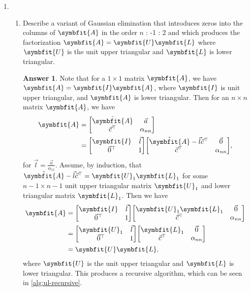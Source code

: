 \documentclass{article}
\theoremstyle{definition}
\newtheorem*{answer}{Answer}
\newcommand{\mat}[1]{\symbfit{#1}}
\begin{document}
\begin{enumerate}[leftmargin=\labelsep]
	\item
	      \begin{enumerate}
		      \item Describe a variant of Gaussian elimination that introduces zeros into the columns of \(\mat{A}\) in the order \(n\) : -1 : 2 and which produces the factorization \(\mat{A} = \mat{U}\mat{L}\) where \(\mat{U}\) is the unit upper triangular and \(\mat{L}\) is lower triangular.
		            \begin{answer}
			            Note that for a \(1 \times 1\) matrix \(\mat{A}\), we have \(\mat{A} = \mat{I}\mat{A}\), where \(\mat{I}\) is unit upper triangular, and \(\mat{A}\) is lower triangular. Then for an \(n \times n\) matrix \(\mat{A}\), we have
			            \begin{align}
				            \mat{A} & = \mqty[\hat{\mat{A}} & \vec{a} \\\vec{c}^\top & \alpha_{nn}]                                        \\
				                    & = \mqty[\mat{I}       & \vec{l} \\\vec{0}^\top & 1]\mqty[\hat{\mat{A}}-\vec{l}\vec{c}^\top & \vec{0} \\\vec{c}^\top&\alpha_{nn}],
			            \end{align}
			            for \(\vec{l} = \frac{\vec{a}}{\alpha_{11}}\). Assume, by induction, that \(\hat{\mat{A}}-\vec{l}\vec{c}^\top = \mat{U}_1\mat{L}_1\) for some \(n-1 \times n-1\) unit upper triangular matrix \(\mat{U}_1\) and lower triangular matrix \(\mat{L}_1\). Then we have
			            \begin{align*}
				            \mat{A} & = \mqty[\mat{I}   & \vec{l} \\\vec{0}^\top & 1]\mqty[\mat{U}_1\mat{L}_1 & \vec{0}\\\vec{c}^\top & \alpha_{nn}] \\
				                    & = \mqty[\mat{U}_1 & \vec{l} \\\vec{0}^\top & 1]\mqty[\mat{L}_1          & \vec{0}\\\vec{c}^\top & \alpha_{nn}] \\
				                    & = \mat{U}\mat{L},
			            \end{align*}
			            where \(\mat{U}\) is the unit upper triangular and \(\mat{L}\) is lower triangular. This produces a recursive algorithm, which can be seen in \cref{alg:ul-recursive}.


\end{answer}
\end{enumerate}
\end{enumerate}
\end{document}
